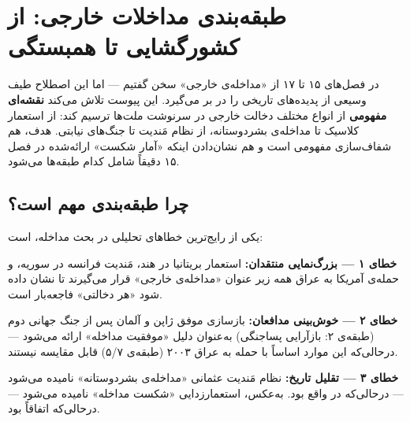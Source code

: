 \chapter{طبقه‌بندی مداخلات خارجی: از کشورگشایی تا همبستگی}
\label{ch:taxonomy-interventions}

\begin{tcolorbox}[mybox, title={درباره‌ی این پیوست}]
در فصل‌های ۱۵ تا ۱۷ از «مداخله‌ی خارجی» سخن گفتیم — اما این اصطلاح طیف
وسیعی از پدیده‌های تاریخی را در بر می‌گیرد.  این پیوست تلاش می‌کند
\textbf{نقشه‌ای مفهومی} از انواع مختلف دخالت خارجی در سرنوشت ملت‌ها ترسیم
کند: از استعمار کلاسیک تا مداخله‌ی بشردوستانه، از نظام مَندیت تا جنگ‌های
نیابتی.  هدف، هم شفاف‌سازی مفهومی است و هم نشان‌دادن اینکه «آمار شکست»
ارائه‌شده در فصل ۱۵ دقیقاً شامل کدام طبقه‌ها می‌شود.
\end{tcolorbox}


\section{چرا طبقه‌بندی مهم است؟}
\label{sec:tax-why}

یکی از رایج‌ترین خطاهای تحلیلی در بحث مداخله،  است:

\begin{tcolorbox}[enemybox, title={سه خطای رایج}]
\textbf{خطای ۱ — بزرگ‌نمایی منتقدان:}
استعمار بریتانیا در هند، مَندیت فرانسه در سوریه، و حمله‌ی آمریکا به
عراق همه زیر عنوان «مداخله‌ی خارجی» قرار می‌گیرند تا نشان داده شود «هر
دخالتی» فاجعه‌بار است.

\textbf{خطای ۲ — خوش‌بینی مدافعان:}
بازسازی موفق ژاپن و آلمان پس از جنگ جهانی دوم (طبقه‌ی ۲: بازآرایی
پساجنگی) به‌عنوان دلیل «موفقیت مداخله» ارائه می‌شود — درحالی‌که این
موارد اساساً با حمله به عراق ۲۰۰۳ (طبقه‌ی ۵/۷) قابل مقایسه نیستند.

\textbf{خطای ۳ — تقلیل تاریخ:}
نظام مَندیت عثمانی «مداخله‌ی بشردوستانه» نامیده می‌شود — درحالی‌که در
واقع  بود.  به‌عکس، استعمارزدایی «شکست
مداخله» نامیده می‌شود — درحالی‌که اتفاقاً  بود.
\end{tcolorbox}


